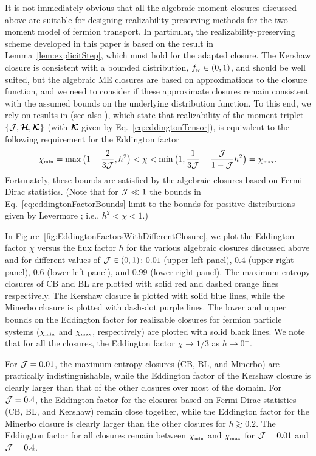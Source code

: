 It is not immediately obvious that all the algebraic moment closures discussed above are suitable for designing realizability-preserving methods for the two-moment model of fermion transport.  
In particular, the realizability-preserving scheme developed in this paper is based on the result in Lemma~\ref{lem:explicitStep}, which must hold for the adapted closure.  
The Kershaw closure is consistent with a bounded distribution, $f_{_{\mbox{\tiny K}}}\in(0,1)$, and should be well suited, but the algebraic ME closures are based on approximations to the closure function, and we need to consider if these approximate closures remain consistent with the assumed bounds on the underlying distribution function.  
To this end, we rely on results in \cite{levermore_1984,lareckiBanach_2011} (see also \cite{kershaw_1976,shohatTamarkin_1943}), which state that realizability of the moment triplet $\{\mathcal{J},\boldsymbol{\mathcal{H}},\boldsymbol{\mathcal{K}}\}$ (with $\boldsymbol{\mathcal{K}}$ given by Eq.~\eqref{eq:eddingtonTensor}), is equivalent to the following requirement for the Eddington factor
\begin{equation}
  \chi_{\mbox{\tiny min}}
  =\max\big(1-\frac{2}{3\mathcal{J}},h^{2}\big)
  <\chi<\min\big(1,\frac{1}{3\mathcal{J}}-\frac{\mathcal{J}}{1-\mathcal{J}}h^{2}\big)=\chi_{\mbox{\tiny max}}.  
  \label{eq:eddingtonFactorBounds}
\end{equation}
Fortunately, these bounds are satisfied by the algebraic closures based on Fermi-Dirac statistics.  
(Note that for $\mathcal{J}\ll1$ the bounds in Eq.~\eqref{eq:eddingtonFactorBounds} limit to the bounds for positive distributions given by Levermore \cite{levermore_1984}; i.e., $h^{2}<\chi<1$.)

In Figure~\ref{fig:EddingtonFactorsWithDifferentClosure}, we plot the Eddington factor $\chi$ versus the flux factor $h$ for the various algebraic closures discussed above and for different values of $\mathcal{J}\in(0,1)$: $0.01$ (upper left panel), $0.4$ (upper right panel), $0.6$ (lower left panel), and $0.99$ (lower right panel).  
The maximum entropy closures of CB and BL are plotted with solid red and dashed orange lines respectively.  
The Kershaw closure is plotted with solid blue lines, while the Minerbo closure is plotted with dash-dot purple lines.  
The lower and upper bounds on the Eddington factor for realizable closures for fermion particle systems ($\chi_{\mbox{\tiny min}}$ and $\chi_{\mbox{\tiny max}}$, respectively) are plotted with solid black lines.  
We note that for all the closures, the Eddington factor $\chi\to1/3$ as $h\to0^{+}$.  

For $\mathcal{J}=0.01$, the maximum entropy closures (CB, BL, and Minerbo) are practically indistinguishable, while the Eddington factor of the Kershaw closure is clearly larger than that of the other closures over most of the domain.  
For $\mathcal{J}=0.4$, the Eddington factor for the closures based on Fermi-Dirac statistics (CB, BL, and Kershaw) remain close together, while the Eddington factor for the Minerbo closure is clearly larger than the other closures for $h\gtrsim0.2$.  
The Eddington factor for all closures remain between $\chi_{\mbox{\tiny min}}$ and $\chi_{\mbox{\tiny max}}$ for $\mathcal{J}=0.01$ and $\mathcal{J}=0.4$.  

